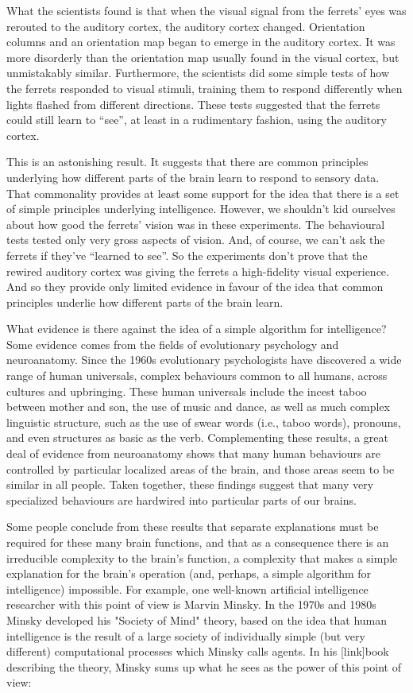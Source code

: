 \documentclass[a4paper,twoside,10pt]{book}
\begin{document}
What the scientists found is that when the visual signal from the ferrets' eyes was rerouted to the auditory cortex, the auditory cortex changed. Orientation columns and an orientation map began to emerge in the auditory cortex. It was more disorderly than the orientation map usually found in the visual cortex, but unmistakably similar. Furthermore, the scientists did some simple tests of how the ferrets responded to visual stimuli, training them to respond differently when lights flashed from different directions. These tests suggested that the ferrets could still learn to ``see'', at least in a rudimentary fashion, using the auditory cortex.

This is an astonishing result. It suggests that there are common principles underlying how different parts of the brain learn to respond to sensory data. That commonality provides at least some support for the idea that there is a set of simple principles underlying intelligence. However, we shouldn't kid ourselves about how good the ferrets' vision was in these experiments. The behavioural tests tested only very gross aspects of vision. And, of course, we can't ask the ferrets if they've ``learned to see''. So the experiments don't prove that the rewired auditory cortex was giving the ferrets a high-fidelity visual experience. And so they provide only limited evidence in favour of the idea that common principles underlie how different parts of the brain learn.

What evidence is there against the idea of a simple algorithm for intelligence? Some evidence comes from the fields of evolutionary psychology and neuroanatomy. Since the 1960s evolutionary psychologists have discovered a wide range of human universals, complex behaviours common to all humans, across cultures and upbringing. These human universals include the incest taboo between mother and son, the use of music and dance, as well as much complex linguistic structure, such as the use of swear words (i.e., taboo words), pronouns, and even structures as basic as the verb. Complementing these results, a great deal of evidence from neuroanatomy shows that many human behaviours are controlled by particular localized areas of the brain, and those areas seem to be similar in all people. Taken together, these findings suggest that many very specialized behaviours are hardwired into particular parts of our brains.

Some people conclude from these results that separate explanations must be required for these many brain functions, and that as a consequence there is an irreducible complexity to the brain's function, a complexity that makes a simple explanation for the brain's operation (and, perhaps, a simple algorithm for intelligence) impossible. For example, one well-known artificial intelligence researcher with this point of view is Marvin Minsky. In the 1970s and 1980s Minsky developed his "Society of Mind" theory, based on the idea that human intelligence is the result of a large society of individually simple (but very different) computational processes which Minsky calls agents. In his [link]book describing the theory, Minsky sums up what he sees as the power of this point of view:
\end{document}
